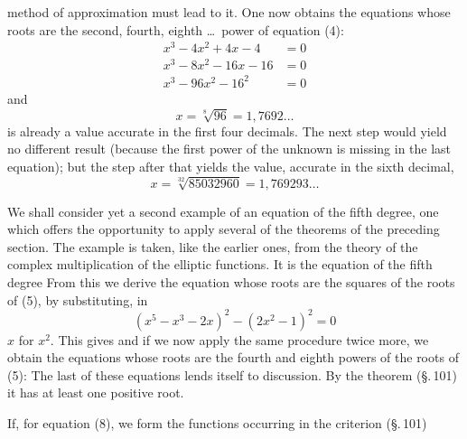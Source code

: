 method of approximation must lead to it. One now obtains the equations whose roots are the second, fourth, eighth \ldots\ power of equation (4):
\[
\begin{aligned}
x^3 - 4x^2 + 4x - 4 &= 0 \\
x^3 - 8x^2 - 16x - 16 &= 0 \\
x^3 - 96x^2 - 16^2 &= 0
\end{aligned}
\]
and
\[
x = \sqrt[8]{96} = 1{,}7692\ldots
\]
is already a value accurate in the first four decimals. The next step would yield no different result (because the first power of the unknown is missing in the last equation); but the step after that yields the value, accurate in the sixth decimal,
\[
x = \sqrt[32]{85032960} = 1{,}769293\ldots
\]

We shall consider yet a second example of an equation of the fifth degree, one which offers the opportunity to apply several of the theorems of the preceding section. The example is taken, like the earlier ones, from the theory of the complex multiplication of the elliptic functions. It is the equation of the fifth degree
From this we derive the equation whose roots are the squares of the roots of (5), by substituting, in
\[
(x^5 - x^3 - 2x)^2 - (2x^2 - 1)^2 = 0
\]
$x$ for $x^2$. This gives
and if we now apply the same procedure twice more, we obtain the equations whose roots are the fourth and eighth powers of the roots of (5):
The last of these equations lends itself to discussion. By the  theorem (\S.\,101) it has at least one positive root.

If, for equation (8), we form the functions occurring in the  criterion (\S.\,101)
